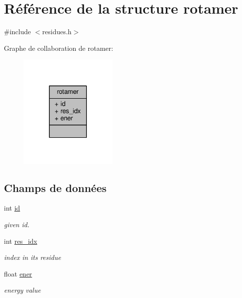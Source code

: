 \hypertarget{structrotamer}{\section{Référence de la structure rotamer}
\label{structrotamer}
}


{\ttfamily \#include $<$residues.\+h$>$}



Graphe de collaboration de rotamer\+:\nopagebreak
\begin{figure}[H]
\begin{center}
\leavevmode
\includegraphics[width=137pt]{structrotamer__coll__graph}
\end{center}
\end{figure}
\subsection*{Champs de données}
\begin{DoxyCompactItemize}
\item 
int \hyperlink{structrotamer_a553cea6422d2e3e3d37da546979c295d}{id}
\begin{DoxyCompactList}\small\item\em given id. \end{DoxyCompactList}\item 
int \hyperlink{structrotamer_ace4d26cd1c42d492487bff840b3690ad}{res\+\_\+idx}
\begin{DoxyCompactList}\small\item\em index in its residue \end{DoxyCompactList}\item 
float \hyperlink{structrotamer_a41b54eb1e0ae5c1ad17d16a54b3c24b1}{ener}
\begin{DoxyCompactList}\small\item\em energy value \end{DoxyCompactList}\end{DoxyCompactItemize}



